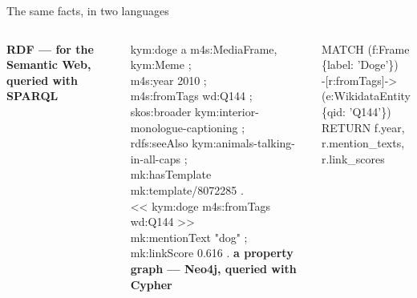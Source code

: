 \begin{frame}[fragile]{The same facts, in two languages}
  \begin{columns}[t]
      {\scriptsize\bfseries\color{gm@col@graph}RDF --- for the Semantic Web, queried with SPARQL}\par\vskip2mm
      {\fontsize{6.6}{8.4}\selectfont\ttfamily
      kym:doge \textcolor{gmInk2}{a} m4s:MediaFrame, kym:Meme ;\\
      \hspace*{4mm}m4s:year 2010 ;\\
      \hspace*{4mm}m4s:fromTags wd:Q144 ;\\
      \hspace*{4mm}skos:broader kym:interior-monologue-captioning ;\\
      \hspace*{4mm}rdfs:seeAlso kym:animals-talking-in-all-caps ;\\
      \hspace*{4mm}mk:hasTemplate mk:template/8072285 .\\[2mm]
      \textcolor{gmInk2}{<<} kym:doge m4s:fromTags wd:Q144 \textcolor{gmInk2}{>>}\\
      \hspace*{4mm}mk:mentionText "dog" ; mk:linkScore 0.616 .}
      {\scriptsize\bfseries\color{gm@col@graph}a property graph --- Neo4j, queried with Cypher}\par\vskip2mm
      {\fontsize{6.6}{8.4}\selectfont\ttfamily
      MATCH (f:Frame \{label: 'Doge'\})\\
      \hspace*{4mm}-[r:fromTags]->\\
      \hspace*{4mm}(e:WikidataEntity \{qid: 'Q144'\})\\
      RETURN f.year, r.mention\_texts,\\
      \hspace*{4mm}r.link\_scores}\par\vskip5mm
\end{columns}
\end{frame}
